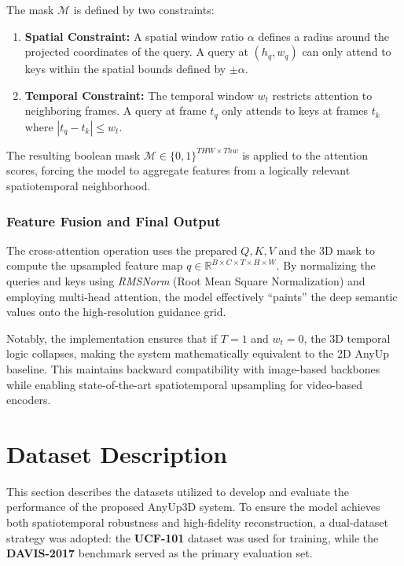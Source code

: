 The mask $\mathcal{M}$ is defined by two constraints:
\begin{enumerate}
    \item \textbf{Spatial Constraint:} A spatial window ratio $\alpha$ defines a radius around the projected coordinates of the query. A query at $(h_q, w_q)$ can only attend to keys within the spatial bounds defined by $\pm \alpha$.
    \item \textbf{Temporal Constraint:} The temporal window $w_t$ restricts attention to neighboring frames. A query at frame $t_q$ only attends to keys at frames $t_k$ where $|t_q - t_k| \leq w_t$.
\end{enumerate}
The resulting boolean mask $\mathcal{M} \in \{0, 1\}^{T H W \times T h w}$ is applied to the attention scores, forcing the model to aggregate features from a logically relevant spatiotemporal neighborhood.

\subsubsection{Feature Fusion and Final Output}
The cross-attention operation uses the prepared $Q, K, V$ and the 3D mask to compute the upsampled feature map $q \in \mathbb{R}^{B \times C \times T \times H \times W}$. By normalizing the queries and keys using \textit{RMSNorm} (Root Mean Square Normalization) and employing multi-head attention, the model effectively ``paints'' the deep semantic values onto the high-resolution guidance grid. 

Notably, the implementation ensures that if $T=1$ and $w_t=0$, the 3D temporal logic collapses, making the system mathematically equivalent to the 2D AnyUp~\cite{anyup} baseline. This maintains backward compatibility with image-based backbones while enabling state-of-the-art spatiotemporal upsampling for video-based encoders.

\section{Dataset Description}
This section describes the datasets utilized to develop and evaluate the performance of the proposed AnyUp3D system. To ensure the model achieves both spatiotemporal robustness and high-fidelity reconstruction, a dual-dataset strategy was adopted: the \textbf{UCF-101} dataset was used for training, while the \textbf{DAVIS-2017} benchmark served as the primary evaluation set.

